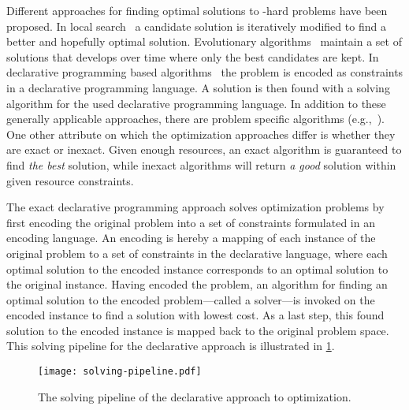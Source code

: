 Different approaches for finding optimal solutions to \NP-hard problems have been proposed.
In local search~\autocite{DBLP:books/daglib/0017492} a candidate solution is iteratively modified to find a better and hopefully optimal solution.
Evolutionary algorithms~\autocites{DBLP:books/daglib/0087893,DBLP:journals/jgo/StornP97} maintain a set of solutions that develops over time where only the best candidates are kept.
In declarative programming based algorithms~\autocite{handbook2-maxsat,ChenEtAl2010-intro,DBLP:reference/fai/2} the problem is encoded as constraints in a declarative programming language.
A solution is then found with a solving algorithm for the used declarative programming language.
In addition to these generally applicable approaches, there are problem specific algorithms (e.g.,~\autocite{DBLP:conf/aaai/DemirovicS21,DBLP:conf/kdd/NijssenF07,DBLP:conf/nips/HuRS19}).
One other attribute on which the optimization approaches differ is whether they are exact or inexact.
Given enough resources, an exact algorithm is guaranteed to find \emph{the best} solution, while inexact algorithms will return \emph{a good} solution within given resource constraints.

The exact declarative programming approach solves optimization problems by first encoding the original problem into a set of constraints formulated in an encoding language.
An encoding is hereby a mapping of each instance of the original problem to a set of constraints in the declarative language, where each optimal solution to the encoded instance corresponds to an optimal solution to the original instance.
Having encoded the problem, an algorithm for finding an optimal solution to the encoded problem---called a solver---is invoked on the encoded instance to find a solution with lowest cost.
As a last step, this found solution to the encoded instance is mapped back to the original problem space.
This solving pipeline for the declarative approach is illustrated in \cref{fig:solving-pipeline}.

\begin{figure}
  \centering
  \texttt{[image: solving-pipeline.pdf]}
  \caption{The solving pipeline of the declarative approach to optimization.}\label{fig:solving-pipeline}
\end{figure}

